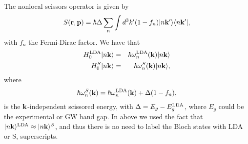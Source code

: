 \documentclass{article}
\begin{document}
The nonlocal scissors operator is given by 
\begin{equation}\label{chon.0}
S(\mathbf{r},\mathbf{p})=\hbar\Delta\sum_n\int d^3k'(1-f_n) | n\mathbf{k}' \rangle\langle n\mathbf{k}' |
,
\end{equation}
with $f_n$ the Fermi-Dirac factor.
We have that
\begin{eqnarray}\label{chon.1}  
H^{\mathrm{LDA}}_0| n\mathbf{k} \rangle&=&\hbar\omega^{\mathrm{LDA}}_n(\mathbf{k})| n\mathbf{k} \rangle
\nonumber\\
H^S_0| n\mathbf{k} \rangle&=&\hbar\omega^S_n(\mathbf{k})| n\mathbf{k} \rangle
,
\end{eqnarray} 
where 
\begin{eqnarray}\label{chon.78}
\hbar\omega^S_n(\mathbf{k})=\hbar\omega^{\mathrm{LDA}}_n(\mathbf{k})+\Delta(1-f_n)
,
\end{eqnarray}
 is the $\mathbf{k}$-independent scissored
energy, with $\Delta=E_g-E_g^{\mathrm{LDA}}$, where $E_g$ could be the experimental
or GW band gap. In above we used the fact that 
$| n\mathbf{k} \rangle^{\mathrm{LDA}}\approx| n\mathbf{k} \rangle^S$, and thus there is no need to label
the Bloch states with LDA or S, superscripts. 
\end{document}
